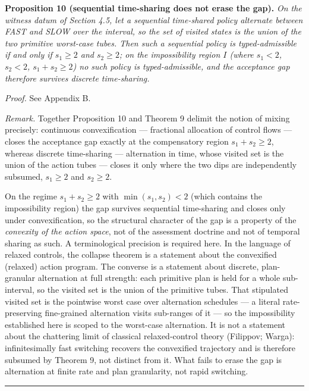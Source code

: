 \documentclass[3p,11pt]{elsarticle}
\begin{document}
\textbf{Proposition 10 (sequential time-sharing does not erase the gap).}
\emph{On the witness datum of Section 4.5, let a sequential time-shared
policy alternate between FAST and SLOW over the interval, so the set of
visited states is the union of the two primitive worst-case tubes. Then
such a sequential policy is typed-admissible if and only if
\(s_1 \ge 2\) and \(s_2 \ge 2\); on the impossibility region \(I\)
(where \(s_1 < 2\), \(s_2 < 2\), \(s_1 + s_2 \ge 2\)) no such policy is
typed-admissible, and the acceptance gap therefore survives discrete
time-sharing.}

\emph{Proof.} See Appendix B.

\emph{Remark.} Together Proposition 10 and Theorem 9 delimit the notion
of mixing precisely: continuous convexification --- fractional
allocation of control flows --- closes the acceptance gap exactly at the
compensatory region \(s_1 + s_2 \ge 2\), whereas discrete time-sharing
--- alternation in time, whose visited set is the union of the action
tubes --- closes it only where the two dips are independently subsumed,
\(s_1 \ge 2\) and \(s_2 \ge 2\).

On the regime \(s_1 + s_2 \ge 2\) with
\(\min(s_1, s_2) < 2\) (which contains the impossibility region) the gap survives sequential time-sharing and closes only under convexification, so the structural character of the gap is a property of
the \emph{convexity of the action space}, not of the assessment doctrine
and not of temporal sharing as such. A terminological precision is
required here. In the language of relaxed controls, the collapse theorem
is a statement about the convexified (relaxed) action program. The
converse is a statement about discrete, plan-granular alternation at
full strength: each primitive plan is held for a whole sub-interval, so
the visited set is the union of the primitive tubes. That stipulated
visited set is the pointwise worst case over alternation schedules --- a
literal rate-preserving fine-grained alternation visits sub-ranges of it
--- so the impossibility established here is scoped to the worst-case
alternation. It is not a
statement about the chattering limit of classical relaxed-control
theory (Filippov; Warga): infinitesimally fast switching recovers the
convexified trajectory and is therefore subsumed by Theorem 9, not
distinct from it. What fails to erase the gap is alternation at finite
rate and plan granularity, not rapid switching.

\begin{center}\rule{0.5\linewidth}{0.5pt}\end{center}
\end{document}
